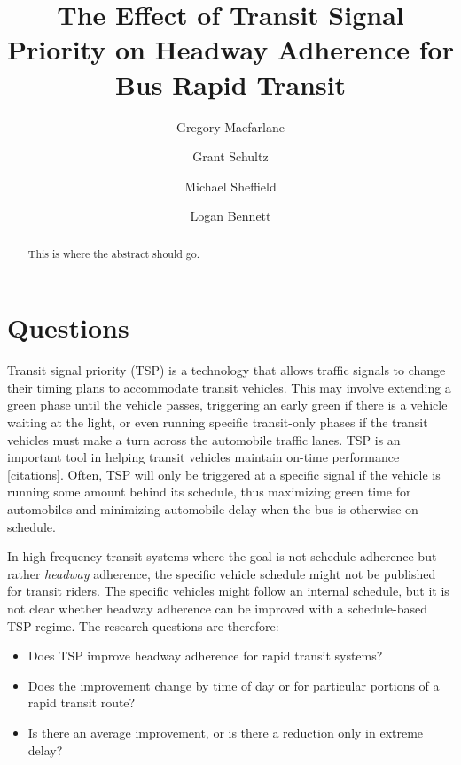 \documentclass[]{elsarticle} %
\providecommand{\tightlist}{%
  \setlength{\itemsep}{0pt}\setlength{\parskip}{0pt}}
\begin{document}
\begin{frontmatter}

  \title{The Effect of Transit Signal Priority on Headway Adherence for Bus Rapid Transit}
    \author[Brigham Young University]{Gregory Macfarlane}
    \author[Brigham Young University]{Grant Schultz}
    \author[WCEC]{Michael Sheffield}
    \author[Brigham Young University]{Logan Bennett}
      \address[Brigham Young University]{Civil and Environmental Engineering Department, 430 Engineering Building, Provo, Utah 84602}
    \address[WCEC]{Some other place}
  
  \begin{abstract}
  This is where the abstract should go.
  \end{abstract}
  
 \end{frontmatter}

\hypertarget{intro}{%
\section{Questions}\label{intro}}

Transit signal priority (TSP) is a technology that allows traffic signals to
change their timing plans to accommodate transit vehicles. This may involve
extending a green phase until the vehicle passes, triggering an early green if
there is a vehicle waiting at the light, or even running specific transit-only
phases if the transit vehicles must make a turn across the automobile traffic lanes.
TSP is an important tool in helping transit vehicles maintain on-time
performance {[}citations{]}. Often, TSP will only be triggered at a specific signal
if the vehicle is running some amount behind its schedule, thus maximizing green
time for automobiles and minimizing automobile delay when the bus is otherwise
on schedule.

In high-frequency transit systems where the goal is not schedule adherence but
rather \emph{headway} adherence, the specific vehicle schedule might not be published
for transit riders. The specific vehicles might follow an internal schedule, but
it is not clear whether headway adherence can be improved with a schedule-based TSP
regime. The research questions are therefore:

\begin{itemize}
\tightlist
\item
  Does TSP improve headway adherence for rapid transit systems?
\item
  Does the improvement change by time of day or for particular portions of
  a rapid transit route?
\item
  Is there an average improvement, or is there a reduction only in extreme delay?
\end{itemize}
\end{document}

